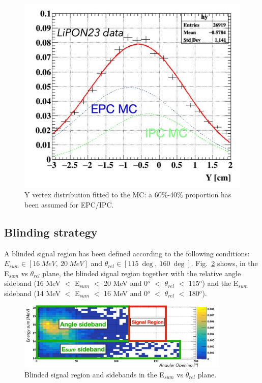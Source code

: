 \begin{refsection}
        \begin{figure}[]
            \centering
            \includegraphics[scale=0.5]{Figures/X17/Analysis/BeamSpotFit.pdf}
            \caption{Y vertex distribution fitted to the MC: a 60$\%$-40$\%$ proportion has been assumed for EPC/IPC.}
            \label{fig:beamspotfit}
        \end{figure}

    \subsection{Blinding strategy}\label{sec:blind}
    A blinded signal region has been defined according to the following conditions: $E_{sum}\in[\SI{16}{MeV},\ \SI{20}{MeV}]$ and $\theta_{rel}\in[\SI{115}{\deg},\ \SI{160}{\deg}]$.
    Fig.~\ref{fig:regions} shows, in the E$_{sum}$ vs $\theta_{rel}$ plane, the blinded signal region together with the relative angle sideband (16 MeV $<$ E$_{sum}$ $<$ 20 MeV and 0$^o$ $<$ $\theta_{rel}$ $<$ 115$^o$) and the E$_{sum}$ sideband (14 MeV $<$ E$_{sum}$ $<$ 16 MeV and 0$^o$ $<$ $\theta_{rel}$ $<$ 180$^o$).
    \begin{figure}[htbp]
        \centering
        \includegraphics[width = 0.9\textwidth]{Figures/X17/Analysis/Regions.pdf}  
        \caption{Blinded signal region and sidebands in the E$_{sum}$ vs $\theta_{rel}$ plane.}
         \label{fig:regions}
    \end{figure}


\end{refsection}
